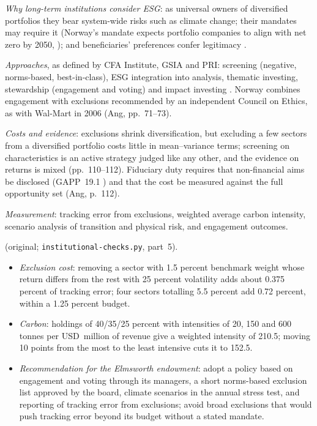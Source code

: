 \begin{qfmethod}\label{meth:institutional-esg-integration}
 \emph{Why long-term institutions consider ESG}: as universal owners of diversified portfolios they bear system-wide risks such as climate change; their mandates may require it (Norway's mandate expects portfolio companies to align with net zero by 2050, \citep[climate action plan]{nbim-gpfg-2026}); and beneficiaries' preferences confer legitimacy \citep[chap.~3, pp.~71--73, 112]{s7-ang}.

\emph{Approaches}, as defined by CFA Institute, GSIA and PRI: screening (negative, norms-based, best-in-class), ESG integration into analysis, thematic investing, stewardship (engagement and voting) and impact investing \citep[Tables~1--2, p.~7]{sustainable-investment-review-2022}. Norway combines engagement with exclusions recommended by an independent Council on Ethics, as with Wal-Mart in 2006 (Ang, pp.~71--73).

\emph{Costs and evidence}: exclusions shrink diversification, but excluding a few sectors from a diversified portfolio costs little in mean--variance terms; screening on characteristics is an active strategy judged like any other, and the evidence on returns is mixed (pp.~110--112). Fiduciary duty requires that non-financial aims be disclosed (GAPP~19.1 \citep[GAPP~19.1]{santiago-principles-2008}) and that the cost be measured against the full opportunity set (Ang, p.~112).

\emph{Measurement}: tracking error from exclusions, weighted average carbon intensity, scenario analysis of transition and physical risk, and engagement outcomes.

 (original; \texttt{institutional-checks.py}, part~5).
\begin{itemize}
\item \emph{Exclusion cost}: removing a sector with 1.5 percent benchmark weight whose return differs from the rest with 25 percent volatility adds about 0.375 percent of tracking error; four sectors totalling 5.5 percent add 0.72 percent, within a 1.25 percent budget.
\item \emph{Carbon}: holdings of 40/35/25 percent with intensities of 20, 150 and 600 tonnes per USD~million of revenue give a weighted intensity of 210.5; moving 10 points from the most to the least intensive cuts it to 152.5.
\item \emph{Recommendation for the Elmsworth endowment}: adopt a policy based on engagement and voting through its managers, a short norms-based exclusion list approved by the board, climate scenarios in the annual stress test, and reporting of tracking error from exclusions; avoid broad exclusions that would push tracking error beyond its budget without a stated mandate.
\end{itemize}


\end{qfmethod}
